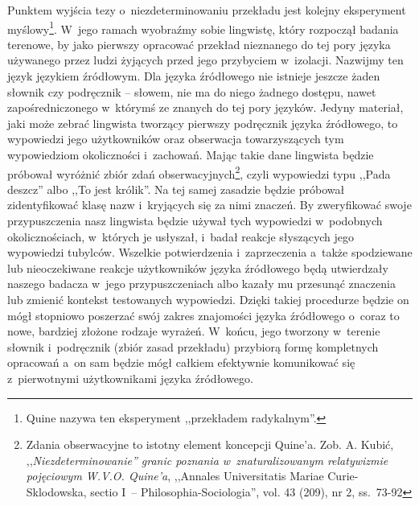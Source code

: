 Punktem wyjścia tezy o~niezdeterminowaniu przekładu jest kolejny eksperyment myślowy\footnote{Quine nazywa ten eksperyment ,,przekładem radykalnym''.}. W~jego ramach wyobraźmy sobie lingwistę, który rozpoczął badania terenowe, by jako pierwszy opracować przekład nieznanego do tej pory języka używanego przez ludzi żyjących przed jego przybyciem w~izolacji. Nazwijmy ten język językiem źródłowym. Dla języka źródłowego nie istnieje jeszcze żaden słownik czy podręcznik -- słowem, nie ma do niego żadnego dostępu, nawet zapośredniczonego w~którymś ze znanych do tej pory języków. Jedyny materiał, jaki może zebrać lingwista tworzący pierwszy podręcznik języka źródłowego, to wypowiedzi jego użytkowników oraz obserwacja towarzyszących tym wypowiedziom okoliczności i~zachowań. Mając takie dane lingwista będzie próbował wyróżnić zbiór zdań obserwacyjnych\footnote{Zdania obserwacyjne to istotny element koncepcji Quine'a. Zob. A. Kubić, ,,\textit{Niezdeterminowanie'' granic poznania w~znaturalizowanym relatywizmie pojęciowym W.V.O. Quine'a}, ,,Annales Universitatis Mariae Curie-Sklodowska, sectio I~-- Philosophia-Sociologia'', vol. 43 (209), nr 2, ss.~73-92}, czyli wypowiedzi typu ,,Pada deszcz'' albo ,,To jest królik''. Na tej samej zasadzie będzie próbował zidentyfikować klasę nazw i~kryjących się za nimi znaczeń. By zweryfikować swoje przypuszczenia nasz lingwista będzie używał tych wypowiedzi w~podobnych okolicznościach, w~których je usłyszał, i~badał reakcje słyszących jego wypowiedzi tubylców. Wszelkie potwierdzenia i~zaprzeczenia a~także spodziewane lub nieoczekiwane reakcje użytkowników języka źródłowego będą utwierdzały naszego badacza w~jego przypuszczeniach albo kazały mu przesunąć znaczenia lub zmienić kontekst testowanych wypowiedzi. Dzięki takiej procedurze będzie on mógł stopniowo poszerzać swój zakres znajomości języka źródłowego o~coraz to nowe, bardziej złożone rodzaje wyrażeń. W~końcu, jego tworzony w~terenie słownik i~podręcznik (zbiór zasad przekładu) przybiorą formę kompletnych opracowań a~on sam będzie mógł całkiem efektywnie komunikować się z~pierwotnymi użytkownikami języka źródłowego.

